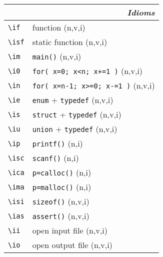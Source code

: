 \documentclass[oneside,10pt,landscape,DIV17]{scrartcl}
\begin{document}
\begin{multicols}{3}
\begin{center}
\begin{tabular}[]{|p{11mm}|p{58mm}|}
\hline 
\multicolumn{2}{|r|}{\textsl{\textbf{I}dioms}}   \\
\hline \verb'\if'  & function                         \hfill (n,v,i)\\
\hline \verb'\isf' & static function                  \hfill (n,v,i)\\
\hline \verb'\im'  & \verb'main()'                    \hfill (n,v,i)\\
\hline \verb'\i0'  & \verb'for( x=0; x<n; x+=1 )'     \hfill (n,v,i)\\
\hline \verb'\in'  & \verb'for( x=n-1; x>=0; x-=1 )'  \hfill (n,v,i)\\
\hline \verb'\ie'  & \verb'enum'   + \verb'typedef'   \hfill (n,v,i)\\
\hline \verb'\is'  & \verb'struct' + \verb'typedef'   \hfill (n,v,i)\\
\hline \verb'\iu'  & \verb'union'  + \verb'typedef'   \hfill (n,v,i)\\
\hline \verb'\ip'  & \verb'printf()'                  \hfill (n,i)\\
\hline \verb'\isc' & \verb'scanf()'                   \hfill (n,i)\\
\hline \verb'\ica' & \verb'p=calloc()'                \hfill (n,i)\\
\hline \verb'\ima' & \verb'p=malloc()'                \hfill (n,i)\\
\hline \verb'\isi' & \verb'sizeof()'                  \hfill (n,v,i)\\
\hline \verb'\ias' & \verb'assert()'                  \hfill (n,v,i)\\
\hline \verb'\ii'  & open input file                  \hfill (n,v,i)\\
\hline \verb'\io'  & open output file                 \hfill (n,v,i)\\
\hline
\end{tabular} \\


\end{center}
\end{multicols}
\end{document}
